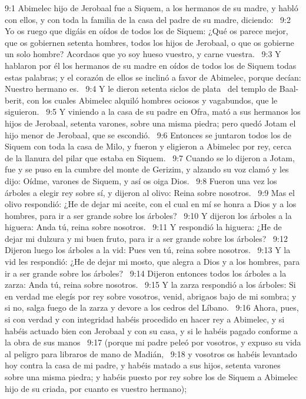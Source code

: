 9:1 Abimelec hijo de Jerobaal fue a Siquem, a los hermanos de su madre, y habló con ellos, y con toda la familia de la casa del padre de su madre, diciendo:  
9:2 Yo os ruego que digáis en oídos de todos los de Siquem: ¿Qué os parece mejor, que os gobiernen setenta hombres, todos los hijos de Jerobaal, o que os gobierne un solo hombre? Acordaos que yo soy hueso vuestro, y carne vuestra.  
9:3 Y hablaron por él los hermanos de su madre en oídos de todos los de Siquem todas estas palabras; y el corazón de ellos se inclinó a favor de Abimelec, porque decían: Nuestro hermano es.  
9:4 Y le dieron setenta siclos de plata  del templo de Baal-berit, con los cuales Abimelec alquiló hombres ociosos y vagabundos, que le siguieron.  
9:5 Y viniendo a la casa de su padre en Ofra, mató a sus hermanos los hijos de Jerobaal, setenta varones, sobre una misma piedra; pero quedó Jotam el hijo menor de Jerobaal, que se escondió.  
9:6 Entonces se juntaron todos los de Siquem con toda la casa de Milo, y fueron y eligieron a Abimelec por rey, cerca de la llanura del pilar que estaba en Siquem.  
9:7 Cuando se lo dijeron a Jotam, fue y se puso en la cumbre del monte de Gerizim, y alzando su voz clamó y les dijo: Oídme, varones de Siquem, y así os oiga Dios.  
9:8 Fueron una vez los árboles a elegir rey sobre sí, y dijeron al olivo: Reina sobre nosotros.  
9:9 Mas el olivo respondió: ¿He de dejar mi aceite, con el cual en mí se honra a Dios y a los hombres, para ir a ser grande sobre los árboles?  
9:10 Y dijeron los árboles a la higuera: Anda tú, reina sobre nosotros.  
9:11 Y respondió la higuera: ¿He de dejar mi dulzura y mi buen fruto, para ir a ser grande sobre los árboles?  
9:12 Dijeron luego los árboles a la vid: Pues ven tú, reina sobre nosotros.  
9:13 Y la vid les respondió: ¿He de dejar mi mosto, que alegra a Dios y a los hombres, para ir a ser grande sobre los árboles?  
9:14 Dijeron entonces todos los árboles a la zarza: Anda tú, reina sobre nosotros.  
9:15 Y la zarza respondió a los árboles: Si en verdad me elegís por rey sobre vosotros, venid, abrigaos bajo de mi sombra; y si no, salga fuego de la zarza y devore a los cedros del Líbano.  
9:16 Ahora, pues, si con verdad y con integridad habéis procedido en hacer rey a Abimelec, y si habéis actuado bien con Jerobaal y con su casa, y si le habéis pagado conforme a la obra de sus manos  
9:17 (porque mi padre peleó por vosotros, y expuso su vida al peligro para libraros de mano de Madián,  
9:18 y vosotros os habéis levantado hoy contra la casa de mi padre, y habéis matado a sus hijos, setenta varones sobre una misma piedra; y habéis puesto por rey sobre los de Siquem a Abimelec hijo de su criada, por cuanto es vuestro hermano);  

